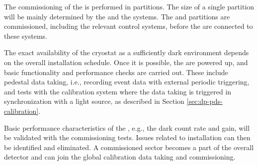 The commissioning of the  is performed in partitions. The size of a single partition will be mainly determined by the  and the  systems. The  and  partitions are commissioned, including the relevant control systems, before the  are connected to these systems.

The exact availability of the cryostat as a sufficiently dark environment depends on the overall installation schedule. Once it is possible, the  are powered up, and basic functionality and performance checks are carried out. These include pedestal data taking, i.e., recording event data with external periodic triggering, and tests with the calibration system where the data taking is triggered in synchronization with a light source, as described in Section \ref{sec:dp-pds-calibration}.

Basic performance characteristics of the , e.g., the dark count rate and gain, will be validated with the commissioning tests. Issues related to installation can then be identified and eliminated. A commissioned sector becomes a part of the overall detector and can join the global calibration data taking and commissioning.


